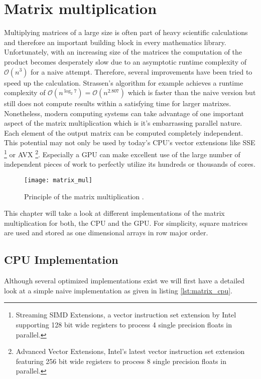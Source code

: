 \section{Matrix multiplication}

Multiplying matrices of a large size is often part of heavy scientific calculations and therefore an important building block in every mathematics library. Unfortunately, with an increasing size of the matrices the computation of the product becomes desperately slow due to an asymptotic runtime complexity of $\mathcal{O}(n^3)$ for a naive attempt. Therefore, several improvements have been tried to speed up the calculation. Strassen's algorithm for example achieves a runtime complexity of $\mathcal{O}(n^{\log_2 7}) = \mathcal{O}(n^{2.807})$ \cite{strassen} which is faster than the naive version but still does not compute results within a satisfying time for larger matrixes.
Nonetheless, modern computing systems can take advantage of one important aspect of the matrix multiplication which is it's embarrassing parallel nature. Each element of the output matrix can be computed completely independent. This potential may not only be used by today's CPU's vector extensions like SSE \footnote{Streaming SIMD Extensions, a vector instruction set extension by Intel supporting 128 bit wide registers to process 4 single precision floats in parallel.} or AVX \footnote{Advanced Vector Extensions, Intel's latest vector instruction set extension featuring 256 bit wide registers to process 8 single precision floats in parallel.}. Especially a GPU can make excellent use of the large number of independent pieces of work to perfectly utilize its hundreds or thousands of cores.

\begin{figure}
\centering
\texttt{[image: matrix\_mul]}
\caption{Principle of the matrix multiplication \cite{wiki_matrix_mul}.}
\label{fig:matrix_mul}
\end{figure}

This chapter will take a look at different implementations of the matrix multiplication for both, the CPU and the GPU. For simplicity, square matrices are used and stored as one dimensional arrays in row major order.

\subsection{CPU Implementation}
\label{sec:matrix_cpu_implementation}

Although several optimized implementations exist we will first have a detailed look at a simple naive implementation as given in listing \ref{lst:matrix_cpu}.

